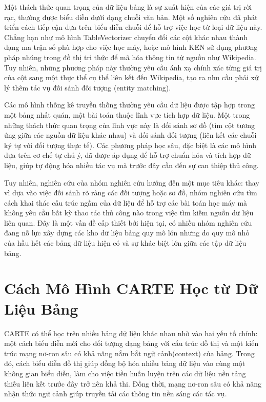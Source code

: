 \documentclass{article}
\begin{document}
Một thách thức quan trọng của dữ liệu bảng là sự xuất hiện của các giá trị rời rạc, thường được biểu diễn dưới dạng chuỗi văn bản. Một số nghiên cứu đã phát triển cách tiếp cận dựa trên biểu diễn chuỗi để hỗ trợ việc học từ loại dữ liệu này. Chẳng hạn như mô hình TableVectorizer chuyển đổi các cột khác nhau thành dạng ma trận số phù hợp cho việc học máy, hoặc mô hình KEN sử dụng phương pháp nhúng trong đồ thị tri thức để mã hóa thông tin từ nguồn như Wikipedia. Tuy nhiên, những phương pháp này thường yêu cầu ánh xạ chính xác từng giá trị của cột sang một thực thể cụ thể liên kết đến Wikipedia, tạo ra nhu cầu phải xử lý thêm tác vụ đối sánh đối tượng (entity matching). 

Các mô hình thống kê truyền thống thường yêu cầu dữ liệu được tập hợp trong một bảng nhất quán, một bài toán thuộc lĩnh vực tích hợp dữ liệu. Một trong những thách thức quan trọng của lĩnh vực này là đối sánh sơ đồ (tìm cột tương ứng giữa các nguồn dữ liệu khác nhau) và đối sánh đối tượng (liên kết các chuỗi ký tự với đối tượng thực tế). Các phương pháp học sâu, đặc biệt là các mô hình dựa trên cơ chế tự chú ý, đã được áp dụng để hỗ trợ chuẩn hóa và tích hợp dữ liệu, giúp tự động hóa nhiều tác vụ mà trước đây cần đến sự can thiệp thủ công.

Tuy nhiên, nghiên cứu của nhóm nghiên cứu hướng đến một mục tiêu khác: thay vì dựa vào việc đối sánh rõ ràng các đối tượng hoặc sơ đồ, nhóm nghiên cứu tìm cách khai thác cấu trúc ngầm của dữ liệu để hỗ trợ các bài toán học máy mà không yêu cầu bất kỳ thao tác thủ công nào trong việc tìm kiếm nguồn dữ liệu liên quan. Đây là một vấn đề cấp thiết bởi hiện tại, có nhiều nhóm nghiên cứu đang nỗ lực xây dựng các kho dữ liệu bảng quy mô lớn nhưng do quy mô nhỏ của hầu hết các bảng dữ liệu hiện có và sự khác biệt lớn giữa các tập dữ liệu bảng. 

\section{Cách Mô Hình CARTE Học từ Dữ Liệu Bảng}
CARTE có thể học trên nhiều bảng dữ liệu khác nhau nhờ vào hai yếu tố chính: một cách biểu diễn mới cho đối tượng dạng bảng với cấu trúc đồ thị và một kiến trúc mạng nơ-ron sâu có khả năng nắm bắt ngữ cảnh(context) của bảng. Trong đó, cách biểu diễn đồ thị giúp đồng bộ hóa nhiều bảng dữ liệu vào cùng một không gian biểu diễn, làm cho việc tiền huấn luyện trên các dữ liệu nền tảng thiếu liên kết trước đây trở nên khả thi. Đồng thời, mạng nơ-ron sâu có khả năng nhận thức ngữ cảnh giúp truyền tải các thông tin nền sáng các tác vụ. 
\end{document}
